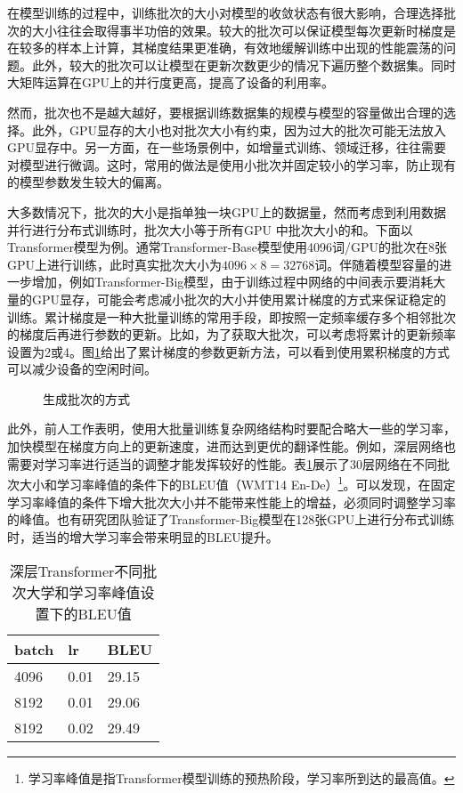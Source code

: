 \parinterval 在模型训练的过程中，训练批次的大小对模型的收敛状态有很大影响，合理选择批次的大小往往会取得事半功倍的效果。较大的批次可以保证模型每次更新时梯度是在较多的样本上计算，其梯度结果更准确，有效地缓解训练中出现的性能震荡的问题。此外，较大的批次可以让模型在更新次数更少的情况下遍历整个数据集。同时大矩阵运算在GPU上的并行度更高，提高了设备的利用率。

\parinterval 然而，批次也不是越大越好，要根据训练数据集的规模与模型的容量做出合理的选择。此外，GPU显存的大小也对批次大小有约束，因为过大的批次可能无法放入GPU显存中。另一方面，在一些场景例中，如增量式训练、领域迁移，往往需要对模型进行微调。这时，常用的做法是使用小批次并固定较小的学习率，防止现有的模型参数发生较大的偏离。

\parinterval 大多数情况下，批次的大小是指单独一块GPU上的数据量，然而考虑到利用数据并行进行分布式训练时，批次大小等于所有GPU 中批次大小的和。下面以Transformer模型为例。通常Transformer-Base模型使用4096词/GPU的批次在8张GPU上进行训练，此时真实批次大小为$4096\times 8=32768$词。伴随着模型容量的进一步增加，例如Transformer-Big模型，由于训练过程中网络的中间表示要消耗大量的GPU显存，可能会考虑减小批次的大小并使用累计梯度的方式来保证稳定的训练。累计梯度是一种大批量训练的常用手段，即按照一定频率缓存多个相邻批次的梯度后再进行参数的更新。比如，为了获取大批次，可以考虑将累计的更新频率设置为2或4。图\ref{fig:7-17}给出了累计梯度的参数更新方法，可以看到使用累积梯度的方式可以减少设备的空闲时间。

\begin{figure}[htp]
\centering

\caption{生成批次的方式}
\label{fig:7-17}
\end{figure}

\parinterval 此外，前人工作表明，使用大批量训练复杂网络结构时要配合略大一些的学习率，加快模型在梯度方向上的更新速度，进而达到更优的翻译性能\cite{DBLP:conf/wmt/OttEGA18}。例如，深层网络也需要对学习率进行适当的调整才能发挥较好的性能。表\ref{tab:7-3}展示了30层网络在不同批次大小和学习率峰值的条件下的BLEU值（WMT14 En-De）\footnote{学习率峰值是指Transformer模型训练的预热阶段，学习率所到达的最高值。}。可以发现，在固定学习率峰值的条件下增大批次大小并不能带来性能上的增益，必须同时调整学习率的峰值。也有研究团队验证了Transformer-Big模型在128张GPU上进行分布式训练时，适当的增大学习率会带来明显的BLEU提升\cite{DBLP:conf/wmt/OttEGA18}。

\begin{table}[htp]
\centering
\caption{深层Transformer不同批次大学和学习率峰值设置下的BLEU值}
\begin{tabular}{ l | l  l }
\rule{0pt}{13pt} batch & lr & BLEU \\ \hline
\rule{0pt}{13pt} 4096 & 0.01 & 29.15 \\
\rule{0pt}{13pt} 8192 & 0.01 & 29.06 \\
\rule{0pt}{13pt} 8192 & 0.02 & 29.49
\end{tabular}
\label{tab:7-3}
\end{table}


